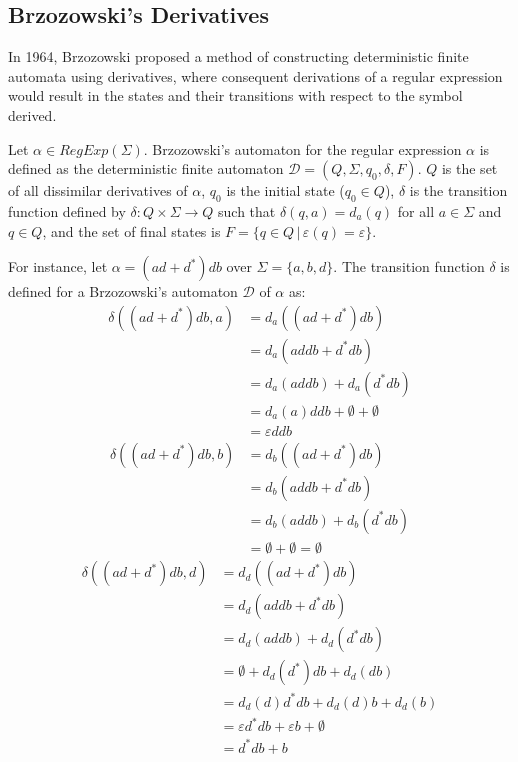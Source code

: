 \subsection{Brzozowski's Derivatives}
In 1964, Brzozowski \cite{brzozowski_derivatives} proposed a method of constructing deterministic finite automata using derivatives, where consequent derivations of a regular expression would result in the states and their transitions with respect to the symbol derived.

\begin{defn}
	Let $\alpha \in RegExp(\Sigma)$. Brzozowski's automaton for the regular expression $\alpha$ is defined as the deterministic finite automaton $\mathcal{D} = (Q, \Sigma, q_0, \delta, F)$. $Q$ is the set of all dissimilar derivatives of $\alpha$, $q_0$ is the initial state ($q_0 \in Q$), $\delta$ is the transition function defined by $\delta: Q \times \Sigma \rightarrow Q$ such that $\delta (q,a) = d_a(q)$ for all $a \in \Sigma$ and $q \in Q$, and the set of final states is $F = \{q \in Q \, | \, \varepsilon(q) = \varepsilon\}$.
\end{defn}

For instance, let $\alpha = (ad+d^*)db$ over $\Sigma = \{a,b,d\}$. The transition function $\delta$ is defined for a Brzozowski's automaton $\mathcal{D}$ of $\alpha$ as:
\begin{align*}
	\delta((ad + d^*)db, a) &= d_a((ad + d^*)db) \\
	&= d_a(addb + d^*db) \\
	&= d_a(addb) + d_a(d^*db) \\
	&= d_a(a)ddb + \emptyset + \emptyset \\
	&= \varepsilon ddb
\end{align*}
\begin{align*}
	\delta((ad + d^*)db, b) &= d_b((ad + d^*)db) \\
	&= d_b(addb + d^*db) \\
	&= d_b(addb) + d_b(d^*db) \\
	&= \emptyset + \emptyset = \emptyset
\end{align*}
\begin{align*}
	\delta((ad + d^*)db, d) &= d_d((ad + d^*)db) \\
	&= d_d(addb + d^*db) \\
	&= d_d(addb) + d_d(d^*db) \\
	&= \emptyset + d_d(d^*)db + d_d(db) \\
	&= d_d(d)d^*db + d_d(d)b + d_d(b) \\
	&= \varepsilon d^*db + \varepsilon b + \emptyset \\
	&= d^*db + b
\end{align*}


